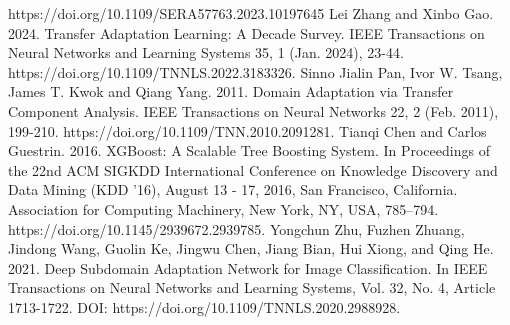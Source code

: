 \documentclass[sigconf,final]{acmart}
\begin{document}
\begin{thebibliography}{99}
{https://doi.org/10.1109/SERA57763.2023.10197645}
 Lei Zhang and Xinbo Gao. 2024. Transfer Adaptation Learning: A Decade Survey. IEEE Transactions on Neural Networks and Learning Systems 35, 1 (Jan. 2024), 23-44. 
 {https://doi.org/10.1109/TNNLS.2022.3183326.}
 Sinno Jialin Pan, Ivor W. Tsang, James T. Kwok and Qiang Yang. 2011. Domain Adaptation via Transfer Component Analysis. IEEE Transactions on Neural Networks 22, 2 (Feb. 2011), 199-210. 
 {https://doi.org/10.1109/TNN.2010.2091281.}
Tianqi Chen and Carlos Guestrin. 2016. XGBoost: A Scalable Tree Boosting System. In Proceedings of the 22nd ACM SIGKDD International Conference on Knowledge Discovery and Data Mining (KDD '16), August 13 - 17, 2016, San Francisco, California. Association for Computing Machinery, New York, NY, USA, 785–794. 
{https://doi.org/10.1145/2939672.2939785.}
Yongchun Zhu, Fuzhen Zhuang, Jindong Wang, Guolin Ke, Jingwu Chen, Jiang Bian, Hui Xiong, and Qing He. 2021. Deep Subdomain Adaptation Network for Image Classification. In IEEE Transactions on Neural Networks and Learning Systems, Vol. 32, No. 4, Article 1713-1722. DOI: {https://doi.org/10.1109/TNNLS.2020.2988928.}
\end{thebibliography}
\end{document}
